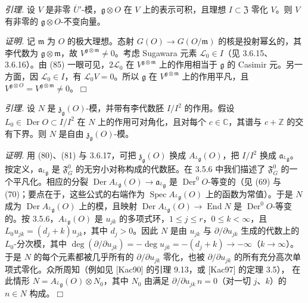 



 \emph{引理.} 设 $V$ 是非零 $\overline{U}'$-模，$\mathfrak{g}\otimes O$ 在 $V$ 上的表示可积，且理想 $I\subset\mathfrak{Z}$ 零化 $V$。则 $V$ 有非零的 $\mathfrak{g}\otimes O$-不变向量。

\emph{证明.} 记 $\mathfrak{m}$ 为 $O$ 的极大理想。态射 $G(O)\to G(O/\mathfrak{m})$ 的核是投射幂幺的，其李代数为 $\mathfrak{g}\otimes\mathfrak{m}$，故 $V^{\mathfrak{g}\otimes\mathfrak{m}}\neq 0$。考虑 Sugawara 元素 $\mathcal{L}_0\in I$（见 3.6.15、3.6.16）。由 (85) 一眼可见，$2\mathcal{L}_0$ 在 $V^{\mathfrak{g}\otimes\mathfrak{m}}$ 上的作用相当于 $\mathfrak{g}$ 的 Casimir 元。另一方面，因 $\mathcal{L}_0\in I$，有 $\mathcal{L}_0V=0$。所以 $\mathfrak{g}$ 在 $V^{\mathfrak{g}\otimes\mathfrak{m}}$ 上的作用平凡，且 $V^{\mathfrak{g}\otimes O}=V^{\mathfrak{g}\otimes\mathfrak{m}}\neq 0$。\hfill$\Box$

 \emph{引理.} 设 $N$ 是 $\mathfrak{z}_{\mathfrak{g}}(O)$-模，并带有李代数胚 $I/I^2$ 的作用。假设 $L_0\in\operatorname{Der}O\subset I/I^2$ 在 $N$ 上的作用可对角化，且对每个 $c\in\mathbb{C}$，其谱与 $c+\mathbb{Z}$ 的交有下界。则 $N$ 是自由 $\mathfrak{z}_{\mathfrak{g}}(O)$-模。

\emph{证明.} 用 (80)、(81) 与 3.6.17，可把 $\mathfrak{z}_{\mathfrak{g}}(O)$ 换成 $A_{{}^{L}\mathfrak{g}}(O)$，把 $I/I^2$ 换成 $\mathfrak{a}_{{}^{L}\mathfrak{g}}$。按定义，$\mathfrak{a}_{{}^{L}\mathfrak{g}}$ 是 $\mathfrak{F}^0_G$ 的无穷小对称构成的代数胚。在 3.5.6 中我们描述了 $\mathfrak{F}^0_G$ 的一个平凡化。相应的分裂 $\operatorname{Der}A_{{}^{L}\mathfrak{g}}(O)\to\mathfrak{a}_{{}^{L}\mathfrak{g}}$ 是 $\operatorname{Der}^0O$-等变的（见 (69) 与 (70)；要点在于，这些公式的右端作为 $\operatorname{Spec}A_{{}^{L}\mathfrak{g}}(O)$ 上的函数为常值）。于是 $N$ 成为 $\operatorname{Der}A_{{}^{L}\mathfrak{g}}(O)$ 上的模，且映射 $\operatorname{Der}A_{{}^{L}\mathfrak{g}}(O)\to\operatorname{End}N$ 是 $\operatorname{Der}^0O$-等变的。按 3.5.6，$A_{{}^{L}\mathfrak{g}}(O)$ 是 $u_{jk}$ 的多项式环，$1\le j\le r$，$0\le k<\infty$，且 $L_0u_{jk}=(d_j+k)u_{jk}$，其中 $d_j>0$。因此 $N$ 是由 $u_{jk}$ 与 $\partial/\partial u_{jk}$ 生成的代数上的 $L_0$-分次模，其中 $\deg(\partial/\partial u_{jk})=-\deg u_{jk}=-(d_j+k)\to-\infty$（$k\to\infty$）。于是 $N$ 的每个元素都被几乎所有的 $\partial/\partial u_{jk}$ 零化，也被 $\partial/\partial u_{jk}$ 的所有充分高次单项式零化。众所周知（例如见 [Kac90] 的引理 9.13，或 [Kac97] 的定理 3.5），
在此情形 $N=A_{{}^{L}\mathfrak{g}}(O)\otimes N_0$，其中 $N_0$ 由满足 $\partial/\partial u_{jk}\,n=0$（对一切 $j$、$k$）的 $n\in N$ 构成。\hfill$\Box$

